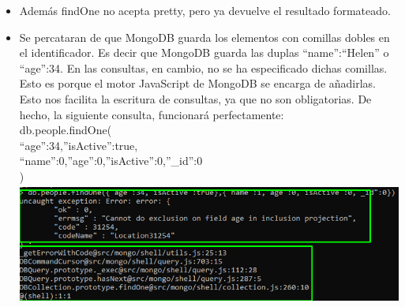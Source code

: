 \documentclass[12pt,a4paper,oneside]{book}
\begin{document}
\begin{itemize}
	\item {Además findOne no acepta pretty, pero ya devuelve el resultado formateado.}\\
	
	\item {Se  percataran  de  que MongoDB  guarda  los  elementos  con  comillas  dobles  en   el   identificador.  Es   decir que MongoDB guarda las duplas “name”:“Helen” o “age”:34. En las consultas, en cambio, no se ha especificado dichas comillas. Esto es porque el motor JavaScript de MongoDB se encarga de añadirlas. Esto nos facilita la escritura de consultas, ya que no son obligatorias. De hecho, la siguiente consulta, funcionará perfectamente:\\
		
		db.people.findOne(\\
		{“age”:34,”isActive”:true},\\
		{“name”:0,”age”:0,”isActive”:0,”\_id”:0}\\
		)
	}\\
	
	\includegraphics[width=16cm, height=4cm]{img/19.png}\\
	
\end{itemize}
	

	
\end{document}
